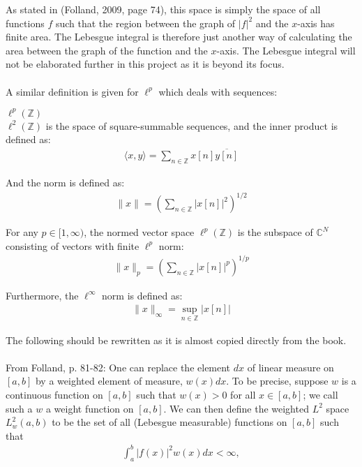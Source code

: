 As stated in (Folland, 2009, page 74), this space is simply the space of all functions $f$ such that the region between the graph of $|f|^2$ and the $x$-axis has finite area. The Lebesgue integral is therefore just another way of calculating the area between the graph of the function and the $x$-axis. The Lebesgue integral will not be elaborated further in this project as it is beyond its focus.
\\ \\
A similar definition is given for $\ell^p$ which deals with sequences:
\begin{definition}{$\ell^p(\mathbb{Z})$}
\\
$\ell^2(\mathbb{Z})$ is the space of square-summable sequences, and the inner product is defined as:
\begin{align*}
\langle x,y \rangle = \sum_{n\in\mathbb{Z}} x[n] \overline{y[n]}
\end{align*}

And the norm is defined as:
\begin{align*}
\|x\| = \left( \sum_{n\in\mathbb{Z}} |x[n]|^2 \right)^{1/2}
\end{align*}

For any $p \in [1,\infty)$, the normed vector space $\ell^p(\mathbb{Z})$ is the subspace of $\mathbb{C}^N$ consisting of vectors with finite $\ell^p$ norm:
\begin{align*}
\|x\|_p = \left( \sum_{n\in\mathbb{Z}} |x[n]|^p \right)^{1/p}
\end{align*}

Furthermore, the $\ell^\infty$ norm is defined as:
\begin{align*}
\|x\|_\infty = \sup_{n\in\mathbb{Z}}|x[n]|
\end{align*}
\end{definition}

The following should be rewritten as it is almost copied directly from the book.
\\ \\
From Folland, p. 81-82:
One can replace the element $dx$ of linear measure on $[a,b]$ by a weighted element of measure, $w(x) dx$. To be precise, suppose $w$ is a continuous function on $[a,b]$ such that $w(x) > 0$ for all $x \in [a,b]$; we call such a $w$ a weight function on $[a,b]$. We can then define the weighted $L^2$ space $L^2_w(a,b)$ to be the set of all (Lebesgue measurable) functions on $[a,b]$ such that
\begin{align*}
\int_a^b |f(x)|^2 w(x) dx < \infty,
\end{align*}

